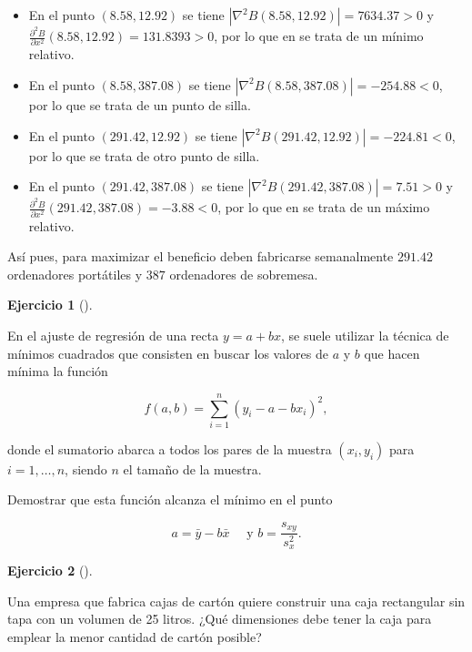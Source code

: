 \documentclass[
  spanish,
  a4paper,
]{scrreport}
\theoremstyle{definition}
\newtheorem{exercise}{Ejercicio}[chapter]
\theoremstyle{remark}
\begin{document}
\begin{tcolorbox}
\begin{itemize}
\item
  En el punto \((8.58, 12.92)\) se tiene
  \(|\nabla^2B(8.58, 12.92)| = 7634.37 >0\) y
  \(\frac{\partial ^2 B}{\partial x^2}(8.58, 12.92)= 131.8393>0\), por
  lo que en se trata de un mínimo relativo.
\item
  En el punto \((8.58, 387.08)\) se tiene
  \(|\nabla^2B(8.58, 387.08)| = -254.88 <0\), por lo que se trata de un
  punto de silla.
\item
  En el punto \((291.42, 12.92)\) se tiene
  \(|\nabla^2B(291.42, 12.92)| = -224.81 <0\), por lo que se trata de
  otro punto de silla.
\item
  En el punto \((291.42, 387.08)\) se tiene
  \(|\nabla^2B(291.42, 387.08)| = 7.51 >0\) y
  \(\frac{\partial ^2 B}{\partial x^2}(291.42, 387.08)= -3.88<0\), por
  lo que en se trata de un máximo relativo.
\end{itemize}

Así pues, para maximizar el beneficio deben fabricarse semanalmente
\(291.42\) ordenadores portátiles y \(387\) ordenadores de sobremesa.

\end{tcolorbox}

\begin{exercise}[]\protect\hypertarget{exr-ajuste-minimos-cuadrados}{}\label{exr-ajuste-minimos-cuadrados}

En el ajuste de regresión de una recta \(y=a+bx\), se suele utilizar la
técnica de mínimos cuadrados que consisten en buscar los valores de
\(a\) y \(b\) que hacen mínima la función

\[
f(a,b)= \sum_{i=1}^{n}(y_i-a-bx_i)^2,
\]

donde el sumatorio abarca a todos los pares de la muestra \((x_i,y_i)\)
para \(i=1,\ldots, n\), siendo \(n\) el tamaño de la muestra.

Demostrar que esta función alcanza el mínimo en el punto

\[
a=\bar y-b\bar x \quad \mbox{ y } b=\frac{s_{xy}}{s_x^2}.
\]

\end{exercise}

\begin{exercise}[]\protect\hypertarget{exr-minimización-material-caja}{}\label{exr-minimización-material-caja}

Una empresa que fabrica cajas de cartón quiere construir una caja
rectangular sin tapa con un volumen de 25 litros. ¿Qué dimensiones debe
tener la caja para emplear la menor cantidad de cartón posible?

\end{exercise}
\end{document}
